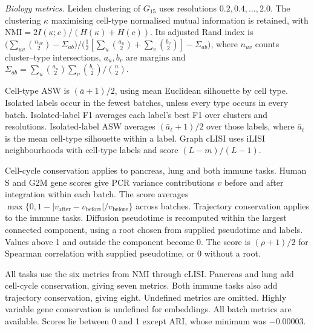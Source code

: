\noindent\textit{Biology metrics.} Leiden clustering of $G_{15}$ uses resolutions $0.2,0.4,\dots,2.0$. The clustering $\kappa$ maximising cell-type normalised mutual information is retained, with $\mathrm{NMI}=2I(\kappa;c)/(H(\kappa)+H(c))$. Its adjusted Rand index is $\big(\sum_{uv}\binom{n_{uv}}2-\Sigma_{ab}\big)/\big(\tfrac12[\sum_u\binom{a_u}2+\sum_v\binom{b_v}2]-\Sigma_{ab}\big)$, where $n_{uv}$ counts cluster--type intersections, $a_u,b_v$ are margins and $\Sigma_{ab}=\sum_u\binom{a_u}2\sum_v\binom{b_v}2/\binom n2$.

Cell-type ASW is $(\bar a+1)/2$, using mean Euclidean silhouette by cell type. Isolated labels occur in the fewest batches, unless every type occurs in every batch. Isolated-label F1 averages each label's best F1 over clusters and resolutions. Isolated-label ASW averages $(\bar a_\ell+1)/2$ over those labels, where $\bar a_\ell$ is the mean cell-type silhouette within a label. Graph cLISI uses iLISI neighbourhoods with cell-type labels and score $(L-m)/(L-1)$.

Cell-cycle conservation applies to pancreas, lung and both immune tasks. Human S and G2M gene scores give PCR variance contributions $v$ before and after integration within each batch. The score averages $\max\{0,1-|v_{\mathrm{after}}-v_{\mathrm{before}}|/v_{\mathrm{before}}\}$ across batches. Trajectory conservation applies to the immune tasks. Diffusion pseudotime is recomputed within the largest connected component, using a root chosen from supplied pseudotime and labels. Values above 1 and outside the component become 0. The score is $(\rho+1)/2$ for Spearman correlation with supplied pseudotime, or 0 without a root.

All tasks use the six metrics from NMI through cLISI. Pancreas and lung add cell-cycle conservation, giving seven metrics. Both immune tasks also add trajectory conservation, giving eight. Undefined metrics are omitted. Highly variable gene conservation is undefined for embeddings. All batch metrics are available. Scores lie between 0 and 1 except ARI, whose minimum was $-0.00003$.
\par\endgroup
